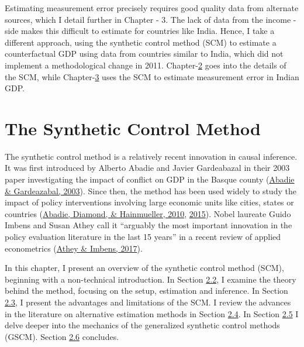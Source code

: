 \documentclass[12pt,nobind, a4paper]{reedthesis}
\begin{document}
 Estimating measurement error precisely requires good quality data from alternate sources, which I detail further in Chapter - 3. The lack of data from the income - side makes this difficult to estimate for countries like India. Hence, I take a different approach, using the synthetic control method (SCM) to estimate a counterfactual GDP using data from countries similar to India, which did not implement a methodological change in 2011. Chapter-\protect\hyperlink{ch2}{2} goes into the details of the SCM, while Chapter-\protect\hyperlink{ch3}{3} uses the SCM to estimate measurement error in Indian GDP.

 \hypertarget{ch2}{%
 \chapter{The Synthetic Control Method}\label{ch2}}

 \newrobustcmd{\B}{\bfseries}

 The synthetic control method is a relatively recent innovation in causal inference. It was first introduced by Alberto Abadie and Javier Gardeabazal in their 2003 paper investigating the impact of conflict on GDP in the Basque county (\protect\hyperlink{ref-abadie_economic_2003}{Abadie \& Gardeazabal, 2003}). Since then, the method has been used widely to study the impact of policy interventions involving large economic units like cities, states or countries (\protect\hyperlink{ref-abadie_synthetic_2010}{Abadie, Diamond, \& Hainmueller, 2010}, \protect\hyperlink{ref-abadie_comparative_2015}{2015}). Nobel laureate Guido Imbens and Susan Athey call it ``arguably the most important innovation in the policy evaluation literature in the last 15 years'' in a recent review of applied econometrics (\protect\hyperlink{ref-athey_state_2017}{Athey \& Imbens, 2017}).
 \linebreak

 In this chapter, I present an overview of the synthetic control method (SCM), beginning with a non-technical introduction. In Section \protect\hyperlink{fmr}{2.2}, I examine the theory behind the method, focusing on the setup, estimation and inference. In Section \protect\hyperlink{advdisadv}{2.3}, I present the advantages and limitations of the SCM. I review the advances in the literature on alternative estimation methods in Section \protect\hyperlink{alt}{2.4}. In Section \protect\hyperlink{gscm}{2.5} I delve deeper into the mechanics of the generalized synthetic control methods (GSCM). Section \protect\hyperlink{conc}{2.6} concludes.
\end{document}
